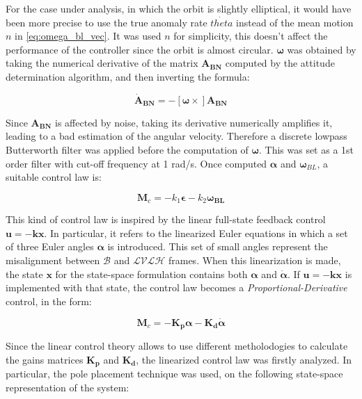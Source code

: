For the case under analysis, in which the orbit is slightly elliptical, it would have been more precise to use the true anomaly rate $\dot{theta}$ instead of the mean motion $n$ in \autoref{eq:omega_bl_vec}. It was used $n$ for simplicity, this doesn't affect the performance of the controller since the orbit is almost circular.  
$\boldsymbol{\omega}$ was obtained by taking the numerical derivative of the matrix $\boldsymbol{A_{BN}}$ computed by the attitude determination algorithm, and then inverting the formula:

\begin{equation}
    \boldsymbol{\dot{A}_{BN}} = -[\boldsymbol{\omega} \times] \boldsymbol{A_{BN}}
\end{equation}

Since $\boldsymbol{A_{BN}}$ is affected by noise, taking its derivative numerically amplifies it, leading to a bad estimation of the angular velocity. Therefore a discrete lowpass Butterworth filter was applied before the computation of $\boldsymbol{\omega}$. This was set as a 1st order filter with cut-off frequency at 1 rad/s. Once computed $\boldsymbol{\alpha}$ and $\boldsymbol{\omega}_{BL}$, a suitable control law is:

\begin{equation}
    \boldsymbol{M}_c=-k_1\boldsymbol{\epsilon}-k_2\boldsymbol{{\omega}_{BL}}
\end{equation}

This kind of control law is inspired by the linear full-state feedback control  $\boldsymbol{u} = -\boldsymbol{kx} $. In particular, it refers to the linearized Euler equations in which a set of three Euler angles $\boldsymbol{\alpha}$ is introduced. This set of small angles represent the misalignment between $\mathcal{B}$ and $\mathcal{LVLH}$ frames. When this linearization is made, the state $\boldsymbol{x}$ for the state-space formulation contains both $\boldsymbol{\alpha}$ and $\dot{\boldsymbol{\alpha}}$. If $\boldsymbol{u} = -\boldsymbol{kx} $ is implemented with that state, the control law becomes a \textit{Proportional-Derivative} control, in the form:

\begin{equation}
    \boldsymbol{M}_c=-\boldsymbol{K_p}\boldsymbol{\alpha}-\boldsymbol{K_d}\dot{\boldsymbol{\alpha}}
\end{equation}

Since the linear control theory allows to use different metholodogies to calculate the gains matrices $\boldsymbol{K_p}$ and $\boldsymbol{K_d}$, the linearized control law was firstly analyzed. In particular, the pole placement technique was used, on the following state-space representation of the system:

